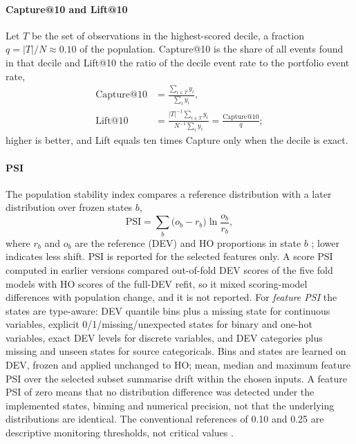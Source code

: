 \documentclass[final,5p,twocolumn]{elsarticle}
\newcommand{\PSI}{\mathrm{PSI}}
\begin{document}
\paragraph{Capture@10 and Lift@10}
Let $T$ be the set of observations in the highest-scored decile, a fraction $q=|T|/N\approx0.10$ of the population. Capture@10 is the share of all events found in that decile and Lift@10 the ratio of the decile event rate to the portfolio event rate,
\begin{equation}
\begin{aligned}
    \mathrm{Capture@10}&=\frac{\sum_{i\in T}y_i}{\sum_{i}y_i},\\
    \mathrm{Lift@10}&=\frac{|T|^{-1}\sum_{i\in T}y_i}{N^{-1}\sum_{i}y_i}=\frac{\mathrm{Capture@10}}{q};
\end{aligned}
    \label{eq:capture10}
\end{equation}
higher is better, and Lift equals ten times Capture only when the decile is exact.

\paragraph{PSI}
The population stability index compares a reference distribution with a later distribution over frozen states $b$,
\begin{equation}
    \PSI=\sum_{b}\big(o_b-r_b\big)\ln\frac{o_b}{r_b},
    \label{eq:psi}
\end{equation}
where $r_b$ and $o_b$ are the reference (DEV) and HO proportions in state $b$ \cite{siddiqi2006,yurdakul2020}; lower indicates less shift. PSI is reported for the selected features only. A score PSI computed in earlier versions compared out-of-fold DEV scores of the five fold models with HO scores of the full-DEV refit, so it mixed scoring-model differences with population change, and it is not reported. For \emph{feature PSI} the states are type-aware: DEV quantile bins plus a missing state for continuous variables, explicit 0/1/missing/unexpected states for binary and one-hot variables, exact DEV levels for discrete variables, and DEV categories plus missing and unseen states for source categoricals. Bins and states are learned on DEV, frozen and applied unchanged to HO; mean, median and maximum feature PSI over the selected subset summarise drift within the chosen inputs. A feature PSI of zero means that no distribution difference was detected under the implemented states, binning and numerical precision, not that the underlying distributions are identical. The conventional references of 0.10 and 0.25 are descriptive monitoring thresholds, not critical values \cite{yurdakul2020}.
\end{document}
